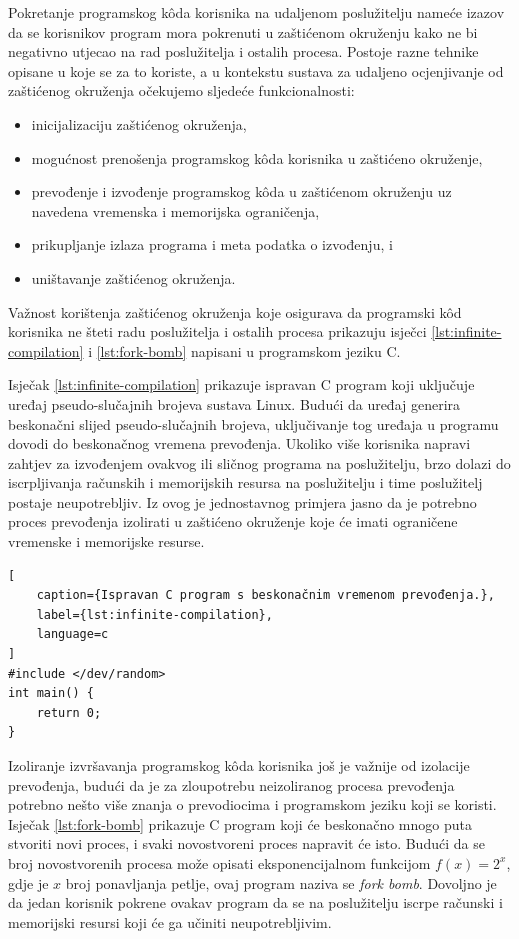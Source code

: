 \documentclass[times, utf8, diplomski]{fer}
\begin{document}
Pokretanje programskog kôda korisnika na udaljenom poslužitelju nameće izazov da se korisnikov program mora pokrenuti u zaštićenom okruženju  kako ne bi negativno utjecao na rad poslužitelja i ostalih procesa. Postoje razne tehnike opisane u \citep{yi2014comparison} koje se za to koriste, a u kontekstu sustava za udaljeno ocjenjivanje od zaštićenog okruženja očekujemo sljedeće funkcionalnosti:
\begin{itemize}
    \item inicijalizaciju zaštićenog okruženja,
    \item mogućnost prenošenja programskog kôda korisnika u zaštićeno okruženje,
    \item prevođenje i izvođenje programskog kôda u zaštićenom okruženju uz navedena vremenska i memorijska ograničenja,
    \item prikupljanje izlaza programa i meta podatka o izvođenju, i
    \item uništavanje zaštićenog okruženja.
\end{itemize}

Važnost korištenja zaštićenog okruženja koje osigurava da programski kôd korisnika ne šteti radu poslužitelja i ostalih procesa prikazuju isječci \ref{lst:infinite-compilation} i \ref{lst:fork-bomb} napisani u programskom jeziku C. 

Isječak \ref{lst:infinite-compilation} prikazuje ispravan C program koji uključuje uređaj pseudo-slučajnih brojeva sustava Linux. Budući da uređaj generira beskonačni slijed pseudo-slučajnih brojeva, uključivanje tog uređaja u programu dovodi do beskonačnog vremena prevođenja. Ukoliko više korisnika napravi zahtjev za izvođenjem ovakvog ili sličnog programa na poslužitelju, brzo dolazi do iscrpljivanja računskih i memorijskih resursa na poslužitelju i time poslužitelj postaje neupotrebljiv.
Iz ovog je jednostavnog primjera jasno da je potrebno proces prevođenja izolirati u zaštićeno okruženje koje će imati ograničene vremenske i memorijske resurse.

\begin{lstlisting}[
    caption={Ispravan C program s beskonačnim vremenom prevođenja.},
    label={lst:infinite-compilation},
    language=c
]
#include </dev/random>
int main() {
    return 0;
}
\end{lstlisting}

Izoliranje izvršavanja programskog kôda korisnika još je važnije od izolacije prevođenja, budući da je za zloupotrebu neizoliranog procesa prevođenja potrebno nešto više znanja o prevodiocima i programskom jeziku koji se koristi. Isječak \ref{lst:fork-bomb} prikazuje C program koji će beskonačno mnogo puta stvoriti novi proces, i svaki novostvoreni proces napravit će isto. Budući da se broj novostvorenih procesa može opisati eksponencijalnom funkcijom $f(x) = 2^x$, gdje je $x$ broj ponavljanja petlje, ovaj program naziva se \textit{fork bomb}. Dovoljno je da jedan korisnik pokrene ovakav program da se na poslužitelju iscrpe računski i memorijski resursi koji će ga učiniti neupotrebljivim.
\end{document}
